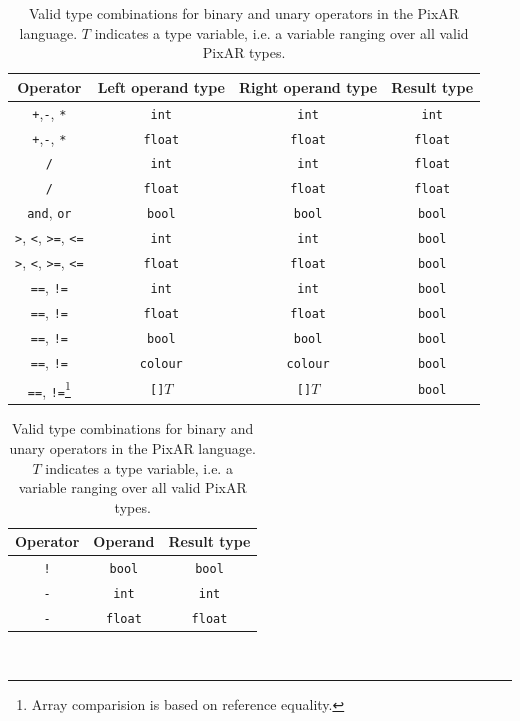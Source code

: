 \documentclass[11pt,a4paper]{scrartcl}
\begin{document}
\begin{table}[ht]
  \centering
  \begin{tabular}{|c|c|c|c|}
    \hline
    Operator & Left operand type & Right operand type & Result type \\ \hline\hline
    \Verb|+|,\Verb|-|, \Verb|*| & \Verb|int| & \Verb|int| & \Verb|int|\\ \hline
    \Verb|+|,\Verb|-|, \Verb|*| & \Verb|float| & \Verb|float| & \Verb|float|\\ \hline
    \Verb|/| & \Verb|int| & \Verb|int| & \Verb|float| \\ \hline
    \Verb|/| & \Verb|float| & \Verb|float| & \Verb|float| \\ \hline
    \Verb|and|, \Verb|or| & \Verb|bool| & \Verb|bool| & \Verb|bool| \\ \hline
    \Verb|>|, \Verb|<|, \Verb|>=|, \Verb|<=| & \Verb|int| & \Verb|int| & \Verb|bool| \\ \hline
    \Verb|>|, \Verb|<|, \Verb|>=|, \Verb|<=| & \Verb|float| & \Verb|float| & \Verb|bool| \\ \hline
    \Verb|==|, \Verb|!=| & \Verb|int| & \Verb|int| & \Verb|bool| \\ \hline
    \Verb|==|, \Verb|!=| & \Verb|float| & \Verb|float| & \Verb|bool| \\ \hline
    \Verb|==|, \Verb|!=| & \Verb|bool| & \Verb|bool| & \Verb|bool| \\ \hline
    \Verb|==|, \Verb|!=| & \Verb|colour| & \Verb|colour| & \Verb|bool| \\ \hline
    \Verb|==|, \Verb|!=|\footnote{Array comparision is based on reference equality.} & \Verb|[]|$T$ & \Verb|[]|$T$ & \Verb|bool| \\ \hline
  \end{tabular}

  \begin{tabular}{|c|c|c|}
    \hline
    Operator & Operand & Result type \\ \hline\hline
    \Verb|!| & \Verb|bool| & \Verb|bool| \\ \hline
    \Verb|-| & \Verb|int| & \Verb|int| \\ \hline
    \Verb|-| & \Verb|float| & \Verb|float| \\ \hline
  \end{tabular}

  \caption{Valid type combinations for binary and unary operators in the PixAR language. $T$ indicates a type variable, i.e. a variable ranging over all valid PixAR types.}~\label{tab:type-checking-operators}
\end{table}
\end{document}
